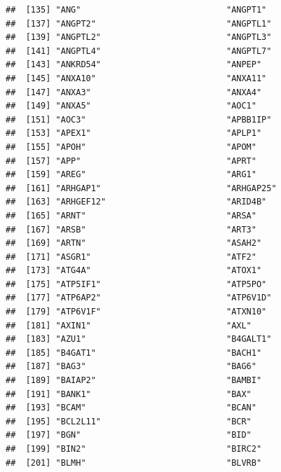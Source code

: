 \documentclass[
]{article}
\begin{document}
\begin{verbatim}
##  [135] "ANG"                             "ANGPT1"                         
##  [137] "ANGPT2"                          "ANGPTL1"                        
##  [139] "ANGPTL2"                         "ANGPTL3"                        
##  [141] "ANGPTL4"                         "ANGPTL7"                        
##  [143] "ANKRD54"                         "ANPEP"                          
##  [145] "ANXA10"                          "ANXA11"                         
##  [147] "ANXA3"                           "ANXA4"                          
##  [149] "ANXA5"                           "AOC1"                           
##  [151] "AOC3"                            "APBB1IP"                        
##  [153] "APEX1"                           "APLP1"                          
##  [155] "APOH"                            "APOM"                           
##  [157] "APP"                             "APRT"                           
##  [159] "AREG"                            "ARG1"                           
##  [161] "ARHGAP1"                         "ARHGAP25"                       
##  [163] "ARHGEF12"                        "ARID4B"                         
##  [165] "ARNT"                            "ARSA"                           
##  [167] "ARSB"                            "ART3"                           
##  [169] "ARTN"                            "ASAH2"                          
##  [171] "ASGR1"                           "ATF2"                           
##  [173] "ATG4A"                           "ATOX1"                          
##  [175] "ATP5IF1"                         "ATP5PO"                         
##  [177] "ATP6AP2"                         "ATP6V1D"                        
##  [179] "ATP6V1F"                         "ATXN10"                         
##  [181] "AXIN1"                           "AXL"                            
##  [183] "AZU1"                            "B4GALT1"                        
##  [185] "B4GAT1"                          "BACH1"                          
##  [187] "BAG3"                            "BAG6"                           
##  [189] "BAIAP2"                          "BAMBI"                          
##  [191] "BANK1"                           "BAX"                            
##  [193] "BCAM"                            "BCAN"                           
##  [195] "BCL2L11"                         "BCR"                            
##  [197] "BGN"                             "BID"                            
##  [199] "BIN2"                            "BIRC2"                          
##  [201] "BLMH"                            "BLVRB"                          

\end{verbatim}
\end{document}
